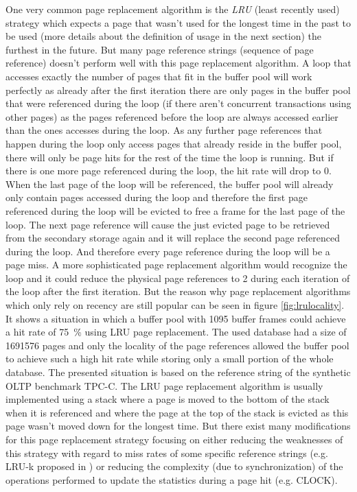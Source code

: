 	One very common page replacement algorithm is the \emph{LRU} (least recently used) strategy which expects a page that wasn't used for the longest time in the past to be used (more details about the definition of usage in the next section) the furthest in the future. But many page reference strings (sequence of page reference) doesn't perform well with this page replacement algorithm. A loop that accesses exactly the number of pages that fit in the buffer pool will work perfectly as already after the first iteration there are only pages in the buffer pool that were referenced during the loop (if there aren't concurrent transactions using other pages) as the pages referenced before the loop are always accessed earlier than the ones accesses during the loop. As any further page references that happen during the loop only access pages that already reside in the buffer pool, there will only be page hits for the rest of the time the loop is running. But if there is one more page referenced during the loop, the hit rate will drop to $0$. When the last page of the loop will be referenced, the buffer pool will already only contain pages accessed during the loop and therefore the first page referenced during the loop will be evicted to free a frame for the last page of the loop. The next page reference will cause the just evicted page to be retrieved from the secondary storage again and it will replace the second page referenced during the loop. And therefore every page reference during the loop will be a page miss. A more sophisticated page replacement algorithm would recognize the loop and it could reduce the physical page references to \num{2} during each iteration of the loop after the first iteration. But the reason why page replacement algorithms which only rely on recency are still popular can be seen in figure \ref{fig:lrulocality}. It shows a situation in which a buffer pool with \num{1095} buffer frames could achieve a hit rate of \SI{75}{\percent} using LRU page replacement. The used database had a size of \num{1691576} pages and only the locality of the page references allowed the buffer pool to achieve such a high hit rate while storing only a small portion of the whole database. The presented situation is based on the reference string of the synthetic OLTP benchmark TPC-C. The LRU page replacement algorithm is usually implemented using a stack where a page is moved to the bottom of the stack when it is referenced and where the page at the top of the stack is evicted as this page wasn't moved down for the longest time. But there exist many modifications for this page replacement strategy focusing on either reducing the weaknesses of this strategy with regard to miss rates of some specific reference strings (e.g. LRU-k proposed in \cite{ONeil:1993}) or reducing the complexity (due to synchronization) of the operations performed to update the statistics during a page hit (e.g. CLOCK).
		
